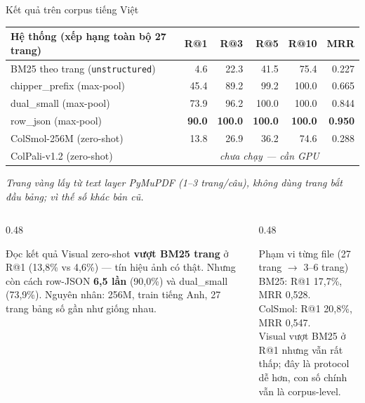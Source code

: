 \documentclass[aspectratio=169,10pt]{beamer}
\begin{document}
\begin{frame}{Kết quả trên corpus tiếng Việt}
  \centering
  \footnotesize
  \begin{tabular}{@{}lrrrrr@{}}
    \toprule
    Hệ thống (xếp hạng toàn bộ 27 trang) & R@1 & R@3 & R@5 & R@10 & MRR \\
    \midrule
    BM25 theo trang (\texttt{unstructured}) & 4.6 & 22.3 & 41.5 & 75.4 & 0.227 \\
    chipper\_prefix (max-pool)             & 45.4 & 89.2 & 99.2 & 100.0 & 0.665 \\
    dual\_small (max-pool)                 & 73.9 & 96.2 & 100.0 & 100.0 & 0.844 \\
    row\_json (max-pool)                   & \textbf{90.0} & \textbf{100.0} & \textbf{100.0} & \textbf{100.0} & \textbf{0.950} \\
    ColSmol-256M (zero-shot)               & 13.8 & 26.9 & 36.2 & 74.6 & 0.288 \\
    ColPali-v1.2 (zero-shot)               & \multicolumn{5}{c}{\textit{chưa chạy — cần GPU}} \\
    \bottomrule
  \end{tabular}

  \vspace{1mm}
  {\scriptsize \textit{Trang vàng lấy từ text layer PyMuPDF (1--3 trang/câu),
  không dùng trang bắt đầu bảng; vì thế số khác bản cũ.}}

  \vspace{2mm}
  \begin{columns}[T]
    \begin{column}{0.48\textwidth}
      \begin{block}{\small Đọc kết quả}
        \footnotesize
        Visual zero-shot \textbf{vượt BM25 trang} ở R@1 (13,8\% vs 4,6\%) ---
        tín hiệu ảnh có thật. Nhưng còn cách row-JSON \textbf{6,5 lần}
        (90,0\%) và dual\_small (73,9\%). Nguyên nhân: 256M, train tiếng Anh,
        27 trang bảng số gần như giống nhau.
      \end{block}
    \end{column}
    \begin{column}{0.48\textwidth}
      \begin{block}{\small Phạm vi từng file (27 trang $\rightarrow$ 3--6 trang)}
        \footnotesize
        BM25: R@1 17,7\%, MRR 0,528.\\
        ColSmol: R@1 20,8\%, MRR 0,547.\\
        Visual vượt BM25 ở R@1 nhưng vẫn rất thấp; đây là protocol dễ hơn,
        con số chính vẫn là corpus-level.
      \end{block}
    \end{column}
  \end{columns}
\end{frame}
\end{document}
